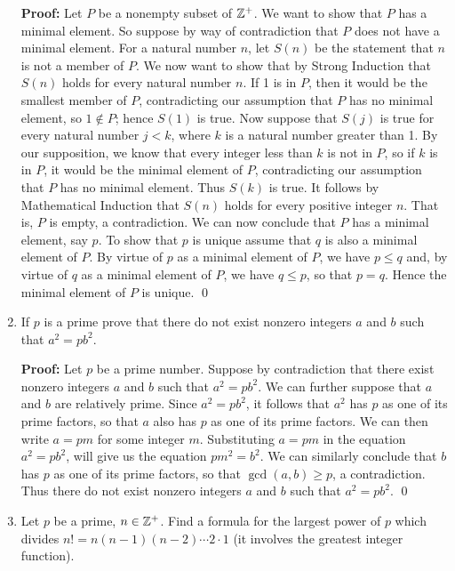 \begin{enumerate}
      \textbf{Proof:} Let $P$ be a nonempty subset of $\mathbb{Z}^+$. We want to show 
      that $P$ has a minimal element. So suppose by way of contradiction that
      $P$ does not have a minimal element. For a natural number $n$, let $S(n)$ 
      be the statement that $n$ is not a member of $P$. We now want to show that
      by Strong Induction that $S(n)$ holds for every natural number $n$. If 1
      is in $P$, then it would be the smallest member of $P$, contradicting our
      assumption that $P$ has no minimal element, so $1 \notin P$; hence $S(1)$ 
      is true. Now suppose that $S(j)$ is true for every natural number $j < k$,
      where $k$ is a natural number greater than 1. By our supposition, we know
      that every integer less than $k$ is not in $P$, so if $k$ is in $P$, it
      would be the minimal element of $P$, contradicting our assumption that $P$
      has no minimal element. Thus $S(k)$ is true. It follows by Mathematical
      Induction that $S(n)$ holds for every positive integer $n$. That is, $P$
      is empty, a contradiction. We can now conclude that $P$ has a minimal 
      element, say $p$. To show that $p$ is unique assume that $q$ is also a
      minimal element of $P$. By virtue of $p$ as a minimal element of $P$, we 
      have $p \le q$ and, by virtue of $q$ as a minimal element of $P$, we have
      $q \le p$, so that $p = q$. Hence the minimal element of $P$ is
      unique. \qed
   \item[0.2.7]   If $p$ is a prime prove that there do not exist nonzero
                  integers $a$ and $b$ such that $a^2 = pb^2$.

      \textbf{Proof:} Let $p$ be a prime number. Suppose by contradiction that 
      there exist nonzero integers $a$ and $b$ such that $a^2 = pb^2$. We can
      further suppose that $a$ and $b$ are relatively prime. Since $a^2 = pb^2$,
      it follows that $a^2$ has $p$ as one of its prime factors, so that $a$
      also has $p$ as one of its prime factors. We can then write $a = pm$
      for some integer $m$. Substituting $a = pm$ in the equation $a^2 = pb^2$,
      will give us the equation $pm^2 = b^2$. We can similarly conclude that
      $b$ has $p$ as one of its prime factors, so that $\gcd(a, b) \ge p$, a
      contradiction. Thus there do not exist nonzero integers $a$ and $b$ such 
      that $a^2 = pb^2$. \qed
   \item[0.2.8]   Let $p$ be a prime, $n \in \mathbb{Z}^+$. Find a formula for the
                  largest power of $p$ which divides
                  $n! = n(n - 1)(n - 2)\cdots2 \cdot 1$ (it involves the
                  greatest integer function).


\end{enumerate}
